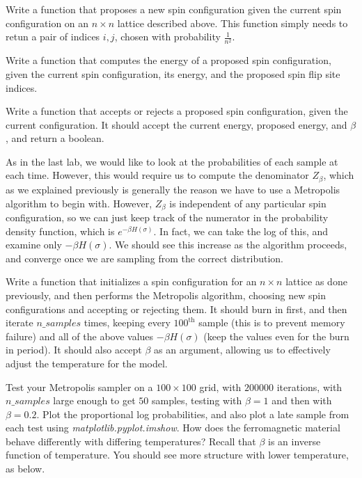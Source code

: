 \begin{problem}
Write a function that proposes a new spin configuration given the current spin configuration on an $n \times n$ lattice described above. This function simply needs to retun a pair of indices $i,j$, chosen with probability $\frac{1}{n^{2}}$.
\end{problem}

\begin{problem}
Write a function that computes the energy of a proposed spin configuration, given the current spin configuration, its energy, and the proposed spin flip site indices.
\end{problem}

\begin{problem}
Write a function that accepts or rejects a proposed spin configuration, given the current configuration. It should accept the current energy, proposed energy, and $\beta$, and return a boolean.
\end{problem}

As in the last lab, we would like to look at the probabilities of each sample at each time. However, this would require us to compute the denominator $Z_{\beta}$, which as we explained previously is generally the reason we have to use a Metropolis algorithm to begin with. However, $Z_{\beta}$ is independent of any particular spin configuration, so we can just keep track of the numerator in the probability density function, which is $e^{-\beta H(\sigma)}$. In fact, we can take the log of this, and examine only $-\beta H(\sigma)$. We should see this increase as the algorithm proceeds, and converge once we are sampling from the correct distribution.

\begin{problem}
Write a function that initializes a spin configuration for an $n \times n$ lattice as done previously, and then performs the Metropolis algorithm, choosing new spin configurations and accepting or rejecting them. It should burn in first, and then iterate $n\_samples$ times, keeping every $100^{\text{th}}$ sample (this is to prevent memory failure) and all of the above values $-\beta H(\sigma)$ (keep the values even for the burn in period). It should also accept $\beta$ as an argument, allowing us to effectively adjust the temperature for the model. 
\end{problem}

\begin{problem}
Test your Metropolis sampler on a $100 \times 100$ grid, with $200000$ iterations, with $n\_samples$ large enough to get $50$ samples, testing with $\beta = 1$ and then with $\beta = 0.2$. Plot the proportional log probabilities, and also plot a late sample from each test using \emph{matplotlib.pyplot.imshow}. How does the ferromagnetic material behave differently with differing temperatures? Recall that $\beta$ is an inverse function of temperature. You should see more structure with lower temperature, as below.
\end{problem}

